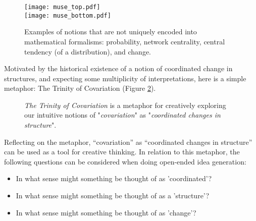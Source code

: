 \documentclass[
  letterpaper,
  DIV=11,
  numbers=noendperiod]{scrreprt}
\begin{document}
\begin{figure}[H]
    \begin{center}
        \texttt{[image: muse\_top.pdf]} \\
        \texttt{[image: muse\_bottom.pdf]}
    \end{center}
    \caption{Examples of notions that are not uniquely encoded into mathematical formalisms: probability, network centrality, central tendency (of a distribution), and change.}
    \label{fig:exampleinstantiations}
\end{figure}

Motivated by the historical existence of a notion of coordinated change
in structures, and expecting some multiplicity of interpretations, here
is a simple metaphor: The Trinity of Covariation (Figure
\ref{fig:trinityofcovariation}).

\begin{figure}[H]
    \begin{center}
    \end{center}
    \caption{\textit{The Trinity of Covariation} is a metaphor for creatively exploring our intuitive notions of "\textit{covariation}" as "\textit{coordinated changes in structure}".}
    \label{fig:trinityofcovariation}
\end{figure}

Reflecting on the metaphor, ``covariation'' as ``coordinated changes in
structure'' can be used as a tool for creative thinking. In relation to
this metaphor, the following questions can be considered when doing
open-ended idea generation:

\begin{itemize}
    \item In what sense might something be thought of as 'coordinated'?
    \item In what sense might something be thought of as a 'structure'?
    \item In what sense might something be thought of as 'change'?
\end{itemize}
\end{document}
